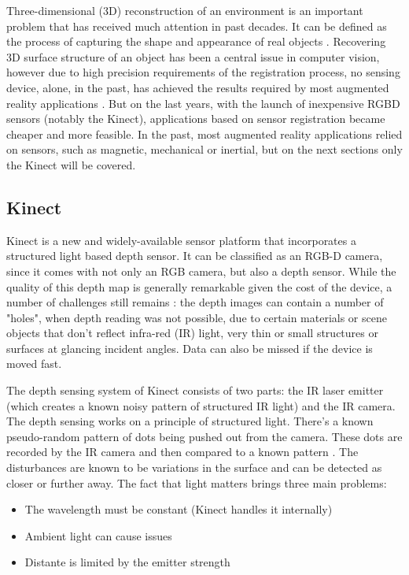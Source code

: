 \documentclass[msc, a4paper, classic, en]{ufbathesis}
\begin{document}
Three-dimensional (3D) reconstruction of an environment is an important problem that has received much attention in past decades. It can be defined as the process of capturing the shape and appearance of real objects \cite{chandra20123}. Recovering 3D surface structure of an object has been a central issue in computer vision, however due to high precision requirements of the registration process, no sensing device, alone, in the past, has achieved the results required by most augmented reality applications \cite{vall98}. But on the last years, with the launch of inexpensive RGBD sensors (notably the Kinect), applications based on sensor registration became cheaper and more feasible. In the past, most augmented reality applications relied on sensors, such as magnetic, mechanical or inertial, but on the next sections only the Kinect will be covered.

\subsection{Kinect}
\label{sec:kinect}

Kinect \cite{kinect} is a new and widely-available sensor platform that incorporates a structured light based depth sensor. It can be classified as an RGB-D camera, since it comes with not only an RGB camera, but also a depth sensor. While the quality of this depth map is generally remarkable given the cost of the device, a number of challenges still remains \cite{kinfu2}: the depth images can contain a number of "holes", when depth reading was not possible, due to certain materials or scene objects that don't reflect infra-red (IR) light, very thin or small structures or surfaces at glancing incident angles. Data can also be missed if the device is moved fast.

The depth sensing system of Kinect consists of two parts: the IR laser emitter (which creates a known noisy pattern of structured IR light) and the IR camera. The depth sensing works on a principle of structured light. There's a known pseudo-random pattern of dots being pushed out from the camera. These dots are recorded by the IR camera and then compared to a known pattern \cite{hackingkinect}. The disturbances are known to be variations in the surface and can be detected as closer or further away. The fact that light matters brings three main problems:

\begin{itemize}
  \item The wavelength must be constant (Kinect handles it internally)
  \item Ambient light can cause issues
  \item Distante is limited by the emitter strength
\end{itemize}
\end{document}
